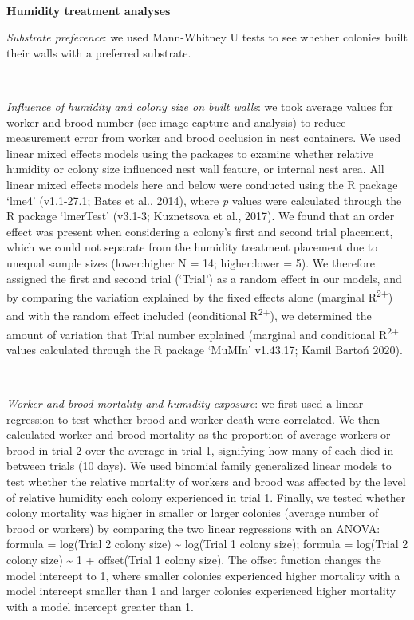 \documentclass[3p]{elsarticle} %
\begin{document}
~

\textbf{Humidity treatment analyses}

\emph{Substrate preference}: we used Mann-Whitney U tests to see whether
colonies built their walls with a preferred substrate.

~

\emph{Influence of humidity and colony size on built walls}: we took
average values for worker and brood number (see image capture and
analysis) to reduce measurement error from worker and brood occlusion in
nest containers. We used linear mixed effects models using the packages
to examine whether relative humidity or colony size influenced nest wall
feature, or internal nest area. All linear mixed effects models here and
below were conducted using the R package `lme4' (v1.1-27.1; Bates et
al., 2014), where \emph{p} values were calculated through the R package
`lmerTest' (v3.1-3; Kuznetsova et al., 2017). We found that an order
effect was present when considering a colony's first and second trial
placement, which we could not separate from the humidity treatment
placement due to unequal sample sizes (lower:higher N = 14; higher:lower
= 5). We therefore assigned the first and second trial (`Trial') as a
random effect in our models, and by comparing the variation explained by
the fixed effects alone (marginal R\textsuperscript{2+}) and with the
random effect included (conditional R\textsuperscript{2+}), we
determined the amount of variation that Trial number explained (marginal
and conditional R\textsuperscript{2+} values calculated through the R
package `MuMIn' v1.43.17; Kamil Bartoń 2020).

~

\emph{Worker and brood mortality and humidity exposure}: we first used a
linear regression to test whether brood and worker death were
correlated. We then calculated worker and brood mortality as the
proportion of average workers or brood in trial 2 over the average in
trial 1, signifying how many of each died in between trials (10 days).
We used binomial family generalized linear models to test whether the
relative mortality of workers and brood was affected by the level of
relative humidity each colony experienced in trial 1. Finally, we tested
whether colony mortality was higher in smaller or larger colonies
(average number of brood or workers) by comparing the two linear
regressions with an ANOVA: formula = log(Trial 2 colony size)
\textasciitilde{} log(Trial 1 colony size); formula = log(Trial 2 colony
size) \textasciitilde{} 1 + offset(Trial 1 colony size). The offset
function changes the model intercept to 1, where smaller colonies
experienced higher mortality with a model intercept smaller than 1 and
larger colonies experienced higher mortality with a model intercept
greater than 1.
\end{document}
